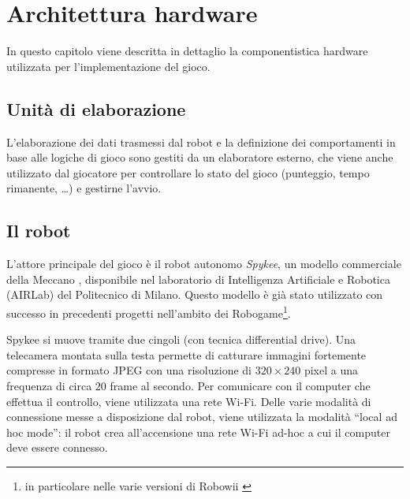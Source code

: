 \chapter{Architettura hardware}
\label{cap:architettura}

In questo capitolo viene descritta in dettaglio la componentistica hardware utilizzata per l'implementazione del gioco.

\section{Unità di elaborazione}
L'elaborazione dei dati trasmessi dal robot e la definizione dei comportamenti in base alle logiche di gioco sono gestiti da un elaboratore esterno, che viene anche utilizzato dal giocatore per controllare lo stato del gioco (punteggio, tempo rimanente, \dots) e gestirne l'avvio.

\section{Il robot}

L'attore principale del gioco è il robot autonomo \emph{Spykee}, un modello commerciale della Meccano \cite{spykeeweb}, disponibile nel laboratorio di Intelligenza Artificiale e Robotica (AIRLab) del Politecnico di Milano. Questo modello è già stato utilizzato con successo in precedenti progetti nell'ambito dei Robogame\footnote{in particolare nelle varie versioni di Robowii \cite{robowii} }.

Spykee si muove tramite due cingoli (con tecnica differential drive). Una telecamera montata sulla testa permette di catturare immagini fortemente compresse in formato JPEG con una risoluzione di $320 \times 240$ pixel a una frequenza di circa $20$ frame al secondo. Per comunicare con il computer che effettua il controllo, viene utilizzata una rete Wi-Fi. Delle varie modalità di connessione messe a disposizione dal robot, viene utilizzata la modalità ``local ad hoc mode'': il robot crea all'accensione una rete Wi-Fi ad-hoc a cui il computer deve essere connesso.


